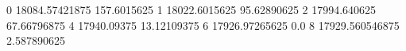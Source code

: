 0 18084.57421875 157.6015625
1 18022.6015625 95.62890625
2 17994.640625 67.66796875
4 17940.09375 13.12109375
6 17926.97265625 0.0
8 17929.560546875 2.587890625
